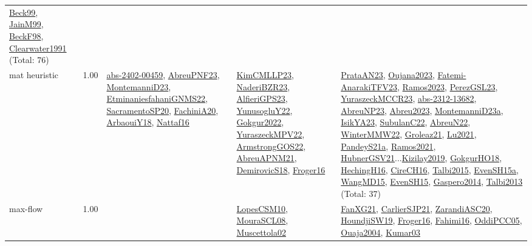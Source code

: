 {\begin{longtable}{p{3cm}r>{\raggedright\arraybackslash}p{6cm}>{\raggedright\arraybackslash}p{6cm}>{\raggedright\arraybackslash}p{8cm}}
\hyperref[detail:Beck99]{Beck99}, \hyperref[detail:JainM99]{JainM99}, \hyperref[detail:BeckF98]{BeckF98}, \hyperref[detail:Clearwater1991]{Clearwater1991} (Total: 76)\\
\index{mat heuristic}\index{Algorithms!mat heuristic}mat heuristic &  1.00 & \hyperref[detail:abs-2402-00459]{abs-2402-00459}, \hyperref[detail:AbreuPNF23]{AbreuPNF23}, \hyperref[detail:MontemanniD23]{MontemanniD23}, \hyperref[detail:EtminaniesfahaniGNMS22]{EtminaniesfahaniGNMS22}, \hyperref[detail:SacramentoSP20]{SacramentoSP20}, \hyperref[detail:FachiniA20]{FachiniA20}, \hyperref[detail:ArbaouiY18]{ArbaouiY18}, \hyperref[detail:Nattaf16]{Nattaf16} & \hyperref[detail:KimCMLLP23]{KimCMLLP23}, \hyperref[detail:NaderiBZR23]{NaderiBZR23}, \hyperref[detail:AlfieriGPS23]{AlfieriGPS23}, \hyperref[detail:YunusogluY22]{YunusogluY22}, \hyperref[detail:Gokgur2022]{Gokgur2022}, \hyperref[detail:YuraszeckMPV22]{YuraszeckMPV22}, \hyperref[detail:ArmstrongGOS22]{ArmstrongGOS22}, \hyperref[detail:AbreuAPNM21]{AbreuAPNM21}, \hyperref[detail:DemirovicS18]{DemirovicS18}, \hyperref[detail:Froger16]{Froger16} & \hyperref[detail:PrataAN23]{PrataAN23}, \hyperref[detail:Oujana2023]{Oujana2023}, \hyperref[detail:Fatemi-AnarakiTFV23]{Fatemi-AnarakiTFV23}, \hyperref[detail:Ramos2023]{Ramos2023}, \hyperref[detail:PerezGSL23]{PerezGSL23}, \hyperref[detail:YuraszeckMCCR23]{YuraszeckMCCR23}, \hyperref[detail:abs-2312-13682]{abs-2312-13682}, \hyperref[detail:AbreuNP23]{AbreuNP23}, \hyperref[detail:Abreu2023]{Abreu2023}, \hyperref[detail:MontemanniD23a]{MontemanniD23a}, \hyperref[detail:IsikYA23]{IsikYA23}, \hyperref[detail:SubulanC22]{SubulanC22}, \hyperref[detail:AbreuN22]{AbreuN22}, \hyperref[detail:WinterMMW22]{WinterMMW22}, \hyperref[detail:Groleaz21]{Groleaz21}, \hyperref[detail:Lu2021]{Lu2021}, \hyperref[detail:PandeyS21a]{PandeyS21a}, \hyperref[detail:Ramos2021]{Ramos2021}, \hyperref[detail:HubnerGSV21]{HubnerGSV21}...\hyperref[detail:Kizilay2019]{Kizilay2019}, \hyperref[detail:GokgurHO18]{GokgurHO18}, \hyperref[detail:HechingH16]{HechingH16}, \hyperref[detail:CireCH16]{CireCH16}, \hyperref[detail:Talbi2015]{Talbi2015}, \hyperref[detail:EvenSH15a]{EvenSH15a}, \hyperref[detail:WangMD15]{WangMD15}, \hyperref[detail:EvenSH15]{EvenSH15}, \hyperref[detail:Gaspero2014]{Gaspero2014}, \hyperref[detail:Talbi2013]{Talbi2013} (Total: 37)\\
\index{max-flow}\index{Algorithms!max-flow}max-flow &  1.00 &  & \hyperref[detail:LopesCSM10]{LopesCSM10}, \hyperref[detail:MouraSCL08]{MouraSCL08}, \hyperref[detail:Muscettola02]{Muscettola02} & \hyperref[detail:FanXG21]{FanXG21}, \hyperref[detail:CarlierSJP21]{CarlierSJP21}, \hyperref[detail:ZarandiASC20]{ZarandiASC20}, \hyperref[detail:HoundjiSW19]{HoundjiSW19}, \hyperref[detail:Froger16]{Froger16}, \hyperref[detail:Fahimi16]{Fahimi16}, \hyperref[detail:OddiPCC05]{OddiPCC05}, \hyperref[detail:Ouaja2004]{Ouaja2004}, \hyperref[detail:Kumar03]{Kumar03}\\

\end{longtable}}
